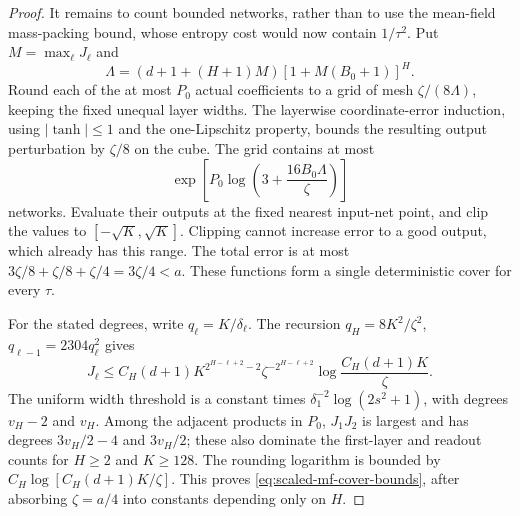 \begin{proof}
It remains to count bounded networks, rather than to use the
mean-field mass-packing bound, whose entropy cost would now contain
$1/\tau^2$.  Put $M=\max_\ell J_\ell$ and
\[
 \Lambda=(d+1+(H+1)M)[1+M(B_0+1)]^H.
\]
Round each of the at most $P_0$ actual coefficients to a grid of mesh
$\zeta/(8\Lambda)$, keeping the fixed unequal layer widths.
The layerwise coordinate-error induction, using $|\tanh|\leq1$ and
the one-Lipschitz property, bounds the resulting output perturbation
by $\zeta/8$ on the cube.  The grid contains at most
\[
 \exp\left[P_0\log\left(3+\frac{16B_0\Lambda}{\zeta}\right)\right]
\]
networks.  Evaluate their outputs at the fixed nearest input-net
point, and clip the values to $[-\sqrt K,\sqrt K]$.
Clipping cannot increase error to a good output, which already has
this range.  The total error is at most
$3\zeta/8+\zeta/8+\zeta/4=3\zeta/4<a$.
These functions form a single deterministic cover for every $\tau$.

For the stated degrees, write $q_\ell=K/\delta_\ell$.
The recursion $q_H=8K^2/\zeta^2$,
$q_{\ell-1}=2304q_\ell^2$ gives
\[
 J_\ell\leq C_H(d+1)
   K^{2^{H-\ell+2}-2}\zeta^{-2^{H-\ell+2}}
                \log\frac{C_H(d+1)K}{\zeta}.
\]
The uniform width threshold is a constant times
$\delta_1^{-2}\log(2s^2+1)$, with degrees $v_H-2$ and $v_H$.
Among the adjacent products in $P_0$, $J_1J_2$ is largest and has
degrees $3v_H/2-4$ and $3v_H/2$; these also dominate the first-layer
and readout counts for $H\geq2$ and $K\geq128$.
The rounding logarithm is bounded by
$C_H\log[C_H(d+1)K/\zeta]$.  This proves
\eqref{eq:scaled-mf-cover-bounds}, after absorbing $\zeta=a/4$
into constants depending only on $H$.
\end{proof}
